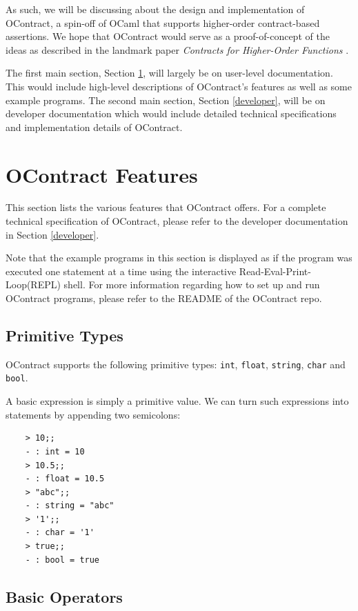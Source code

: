 \documentclass[a4paper]{article}
\begin{document}
As such, we will be discussing about the design and implementation of OContract, a spin-off of OCaml that supports higher-order contract-based assertions.
We hope that OContract would serve as a proof-of-concept of the ideas as described in the landmark paper \emph{Contracts for Higher-Order Functions} \cite{contracts}.

The first main section, Section \ref{user}, will largely be on user-level documentation. This would include high-level descriptions of OContract's features as well as some example programs.
The second main section, Section \ref{developer}, will be on developer documentation which would include detailed technical specifications and implementation details of OContract.

\section{OContract Features}
\label{user}

This section lists the various features that OContract offers.
For a complete technical specification of OContract, please refer to the developer documentation in Section \ref{developer}.

Note that the example programs in this section is displayed as if the program was executed one statement at a time using the interactive Read-Eval-Print-Loop(REPL) shell.
For more information regarding how to set up and run OContract programs, please refer to the README of the OContract repo.

\subsection{Primitive Types}

OContract supports the following primitive types: \texttt{int}, \texttt{float}, \texttt{string}, \texttt{char} and \texttt{bool}.

A basic expression is simply a primitive value. We can turn such expressions into statements by appending two semicolons:

\begin{verbatim}
    > 10;;
    - : int = 10
    > 10.5;;
    - : float = 10.5
    > "abc";;
    - : string = "abc"
    > '1';;
    - : char = '1'
    > true;;
    - : bool = true
\end{verbatim}

\subsection{Basic Operators}
\end{document}

